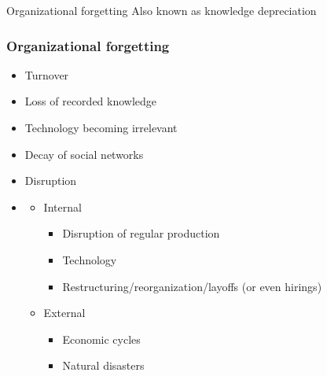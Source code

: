 \begin{frame}
	\begin{block}{}
		\Huge Organizational forgetting
		\bigbreak		
		\normalsize Also known as knowledge depreciation
	\end{block}{}
\end{frame}

\begin{frame}
	\frametitle{Organizational forgetting}
	\begin{itemize}
		\item Turnover \citep{DeHolan2004,Rao2006}
		\item Loss of recorded knowledge
		\item Technology becoming irrelevant
		\item Decay of social networks \citep{Argote2013_3,Argote1990,Thompson2007}
		\item Disruption
		\item 
		\begin{itemize}
			\item Internal
				\begin{itemize}
					\item Disruption of regular production 
					\item Technology \citep{Amburgey1993,Edmondson2001}
					\item Restructuring/reorganization/layoffs (or even hirings) \citep{Benkard2000,Anderson2014}
				\end{itemize}
			\item External
				\begin{itemize}
					\item Economic cycles \citep{Rockart2019}
					\item Natural disasters \citep{Anderson2014}
				\end{itemize}
		\end{itemize}
	\end{itemize}
\end{frame}



